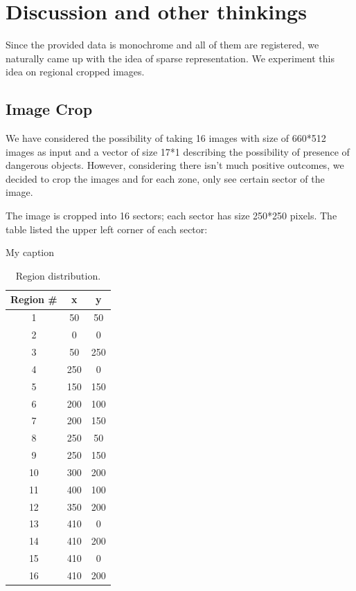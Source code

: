 \documentclass[conference,compsoc]{IEEEtran}
\begin{document}
\section{Discussion and other thinkings}
Since the provided data is monochrome and all of them are registered, we naturally came up with the idea of sparse representation. We experiment this idea on regional cropped images.

\subsection{Image Crop}
We have considered the possibility of taking 16 images with size of 660*512 images as input and a vector of size 17*1 describing the possibility of presence of dangerous objects. However, considering there isn't much positive outcomes, we decided to crop the images and for each zone, only see certain sector of the image.


The image is cropped into 16 sectors; each sector has size 250*250 pixels. The table listed the upper left corner of each sector:
\begin{table}[!htb]
    \centering
    \caption{My caption}
    \label{my-label}
    \begin{tabular}{ccc}
        \hline
        Region \# & x   & y   \\ \hline
        1         & 50  & 50  \\ \hline
        2         & 0   & 0   \\ \hline
        3         & 50  & 250 \\ \hline
        4         & 250 & 0   \\ \hline
        5         & 150 & 150 \\ \hline
        6         & 200 & 100 \\ \hline
        7         & 200 & 150 \\ \hline
        8         & 250 & 50  \\ \hline
        9         & 250 & 150 \\ \hline
        10        & 300 & 200 \\ \hline
        11        & 400 & 100 \\ \hline
        12        & 350 & 200 \\ \hline
        13        & 410 & 0   \\ \hline
        14        & 410 & 200 \\ \hline
        15        & 410 & 0   \\ \hline
        16        & 410 & 200 \\ \hline
    \end{tabular}
    \caption{Region distribution.}
\end{table}
\end{document}
